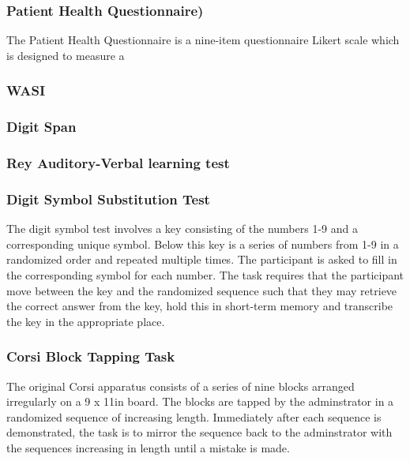 \documentclass{article}
\begin{document}
\subsubsection{Patient Health Questionnaire)}
The Patient Health Questionnaire is a nine-item questionnaire Likert scale which is designed to measure a 
\subsubsection{WASI}
\subsubsection{Digit Span}
\subsubsection{Rey Auditory-Verbal learning test}

\subsubsection{Digit Symbol Substitution Test}
The digit symbol test involves a key consisting of the numbers 1-9 and a corresponding unique symbol. Below this key is a series of numbers from 1-9 in a randomized order and repeated multiple times. The participant is asked to fill in the corresponding symbol for each number. The task requires that the participant move between the key and the randomized sequence such that  they may retrieve the correct answer from the key, hold this in short-term memory and transcribe the key in the appropriate place.

\subsubsection{Corsi Block Tapping Task}
The original Corsi apparatus consists of a series of nine blocks arranged irregularly on a 9 x 11in board. The blocks are tapped by the adminstrator in a randomized sequence of increasing length. Immediately after each sequence is demonstrated, the task is to mirror the sequence back to the adminstrator with the sequences increasing in length until a mistake is made. 
\end{document}
